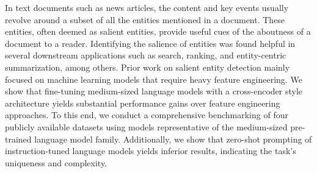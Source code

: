 In text documents such as news articles, the content and key events usually revolve around a subset of all the entities mentioned in a document. These entities, often deemed as salient entities, provide useful cues of the aboutness of a document to a reader. Identifying the salience of entities was found helpful in several downstream applications such as search, ranking, and entity-centric summarization, among others. Prior work on salient entity detection mainly focused on machine learning models that require heavy feature engineering. We show that fine-tuning medium-sized language models with a cross-encoder style architecture yields substantial performance gains over feature engineering approaches. To this end, we conduct a comprehensive benchmarking of four publicly available datasets using models representative of the medium-sized pre-trained language model family. Additionally, we show that zero-shot prompting of instruction-tuned language models yields inferior results, indicating the task's uniqueness and complexity.